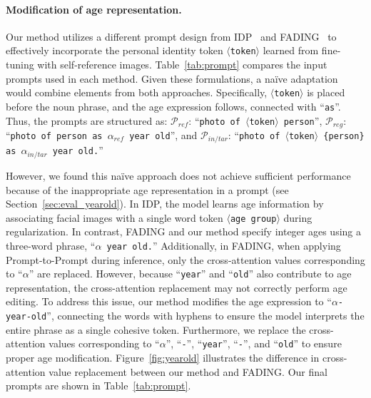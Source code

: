 \paragraph{Modification of age representation.
}
Our method utilizes a different prompt design from IDP~\cite{banerjee2023identity} and FADING~\cite{chen2023face} to effectively incorporate the personal identity token \texttt{$\langle$token$\rangle$} learned from fine-tuning with self-reference images. 
Table~\ref{tab:prompt} compares the input prompts used in each method.
Given these formulations, a na\"ive adaptation would combine elements from both approaches.
Specifically, \texttt{$\langle$token$\rangle$} is placed before the noun phrase, and the age expression follows, connected with ``\texttt{as}''. Thus, the prompts are structured as:
$\mathcal{P}_\mathit{ref}$: ``\texttt{photo of $\langle$token$\rangle$ person}'',
$\mathcal{P}_\mathit{reg}$: ``\texttt{photo of person as $\alpha_\mathit{ref}$ year old}'', and
$\mathcal{P}_\mathit{in/tar}$: ``\texttt{photo of $\langle$token$\rangle$ \{person\} as $\alpha_\mathit{in/tar}$ year old.}''

However, we found this na\"ive approach does not achieve sufficient performance because of the inappropriate age representation in a prompt (see Section~\ref{sec:eval_yearold}). 
In IDP, the model learns age information by associating facial images with a single word token \texttt{$\langle$age group$\rangle$} during regularization.
In contrast, FADING and our method specify integer ages using a three-word phrase, ``\texttt{$\alpha$ year old.}''
Additionally, in FADING, when applying Prompt-to-Prompt during inference, only the cross-attention values corresponding to ``\texttt{$\alpha$}'' are replaced.
However, because ``\texttt{year}'' and ``\texttt{old}'' also contribute to age representation, the cross-attention replacement may not correctly perform age editing. 
To address this issue, our method modifies the age expression to ``\texttt{$\alpha$-year-old}'', connecting the words with hyphens to ensure the model interprets the entire phrase as a single cohesive token.
Furthermore, we replace the cross-attention values corresponding to ``\texttt{$\alpha$}'', ``\texttt{-}'', ``\texttt{year}'', ``\texttt{-}'', and ``\texttt{old}'' to ensure proper age modification.
Figure~\ref{fig:yearold} illustrates the difference in cross-attention value replacement between our method and FADING. Our final prompts are shown in Table~\ref{tab:prompt}. 

